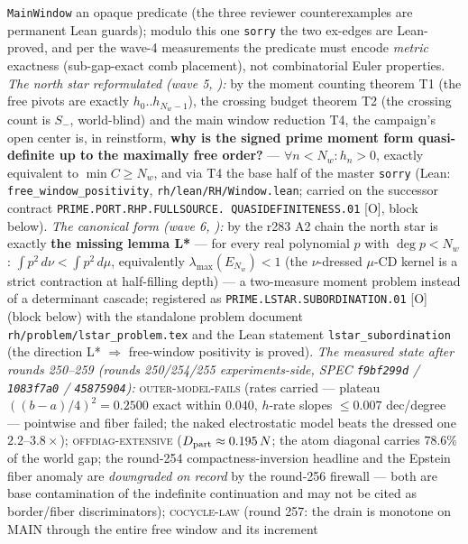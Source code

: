 {\texttt{MainWindow} an opaque predicate (the three reviewer
counterexamples are permanent Lean guards); modulo this one
\texttt{sorry} the two ex-edges are Lean-proved, and per the
wave-4 measurements the predicate must encode \emph{metric}
exactness (sub-gap-exact comb placement), not combinatorial Euler
properties.  \emph{The north star reformulated (wave 5,
):} by the moment
counting theorem T1 (the free pivots are exactly
$h_0..h_{N_w-1}$), the crossing budget theorem T2 (the crossing
count is $S_-$, world-blind) and the main window reduction T4,
the campaign's open center is, in reinstform, \textbf{why is the
signed prime moment form quasi-definite up to the maximally free
order?} --- $\forall n < N_w : h_n > 0$, exactly equivalent to
$\min C \ge N_w$, and via T4 the base half of the master
\texttt{sorry} (Lean: \texttt{free\_window\_positivity},
\texttt{rh/lean/RH/Window.lean}; carried on the successor
contract \texttt{PRIME.PORT.RHP.FULLSOURCE.\allowbreak
QUASIDEFINITENESS.01} [O], block below).  \emph{The canonical
form (wave 6, ):}
by the r283 A2 chain the north star is exactly \textbf{the
missing lemma L*} --- for every real polynomial $p$ with $\deg
p < N_w$: $\int p^2\,d\nu < \int p^2\,d\mu$, equivalently
$\lambda_{\max}(E_{N_w}) < 1$ (the $\nu$-dressed $\mu$-CD kernel
is a strict contraction at half-filling depth) --- a two-measure
moment problem instead of a determinant cascade; registered as
\texttt{PRIME.LSTAR.\allowbreak SUBORDINATION.01} [O] (block
below) with the standalone problem document
\texttt{rh/problem/lstar\_problem.tex} and the Lean statement
\texttt{lstar\_subordination} (the direction L* $\Rightarrow$
free-window positivity is proved).  \emph{The measured
state after
rounds 250--259 (rounds 250/254/255 experiments-side, SPEC
\texttt{f9bf299d} / \texttt{1083f7a0} / \texttt{45875904}):}
\textsc{outer-model-fails} (rates carried
--- plateau $((b-a)/4)^2 = 0.2500$ exact within $0.040$, $h$-rate
slopes $\le 0.007$ dec/degree --- pointwise and fiber failed; the
naked electrostatic model beats the dressed one
$2.2$--$3.8\times$); \textsc{offdiag-extensive} ($D_{\rm part}
\approx 0.195\,N$; the atom diagonal carries $78.6\%$ of the
world gap; the round-254 compactness-inversion headline and the
Epstein fiber anomaly are \emph{downgraded on record} by the
round-256 firewall --- both are base contamination of the
indefinite continuation and may not be cited as border/fiber
discriminators); \textsc{cocycle-law} (round 257: the drain is
monotone on MAIN through the entire free window and its increment
}
